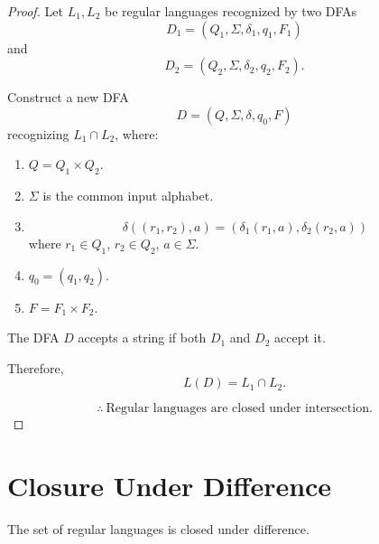 \documentclass[11pt]{scrreprt}
\begin{document}
\begin{proof}
    Let $L_1, L_2$ be regular languages recognized by two DFAs
    \[
        D_1 = (Q_1, \Sigma, \delta_1, q_1, F_1)
    \]
    and
    \[
        D_2 = (Q_2, \Sigma, \delta_2, q_2, F_2).
    \]

    Construct a new DFA
    \[
        D = (Q, \Sigma, \delta, q_0, F)
    \]
    recognizing $L_1 \cap L_2$, where:

    \begin{enumerate}
        \item $Q = Q_1 \times Q_2$.

        \item $\Sigma$ is the common input alphabet.

        \item
        \[
            \delta((r_1,r_2),a)
            =
            (\delta_1(r_1,a),\delta_2(r_2,a))
        \]
        where $r_1 \in Q_1$, $r_2 \in Q_2$,
        $a \in \Sigma$.

        \item $q_0 = (q_1,q_2)$.

        \item $F = F_1 \times F_2$.
    \end{enumerate}

    The DFA $D$ accepts a string if both $D_1$ and $D_2$
    accept it.

    Therefore,
    \[
        L(D) = L_1 \cap L_2.
    \]

    \[
        \boxed{
            \therefore\ \text{Regular languages are closed under intersection.}
        }
    \]
\end{proof}

\section{Closure Under Difference}
\begin{theorem*}
    The set of regular languages is closed under difference.
\end{theorem*} 
\end{document}

